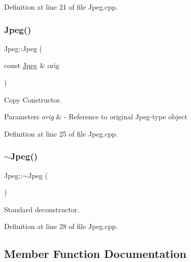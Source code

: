 Definition at line 21 of file Jpeg.\+cpp.

\mbox{\label{classJpeg_abc02dc366057e25e538b8c76c5463554}} 
\subsubsection{\texorpdfstring{Jpeg()}{Jpeg()}\hspace{0.1cm}{\footnotesize\ttfamily [3/3]}}
{\footnotesize\ttfamily Jpeg\+::\+Jpeg (\begin{DoxyParamCaption}\item[{const \mbox{\hyperlink{classJpeg}{Jpeg}} \&}]{orig }\end{DoxyParamCaption})}



Copy Constructor. 


\begin{DoxyParams}{Parameters}
{\em orig} & -\/ Reference to original Jpeg-\/type object \\
\hline
\end{DoxyParams}


Definition at line 25 of file Jpeg.\+cpp.

\mbox{\label{classJpeg_aa03b879cc5185f52c4c9e39faf03db85}} 
\subsubsection{\texorpdfstring{$\sim$Jpeg()}{~Jpeg()}}
{\footnotesize\ttfamily Jpeg\+::$\sim$\+Jpeg (\begin{DoxyParamCaption}{ }\end{DoxyParamCaption})\hspace{0.3cm}{\ttfamily [virtual]}}

Standard deconstructor. 

Definition at line 28 of file Jpeg.\+cpp.



\subsection{Member Function Documentation}
\mbox{\label{classJpeg_a80db9e22efc544e32145b6743b2b407c}} 
